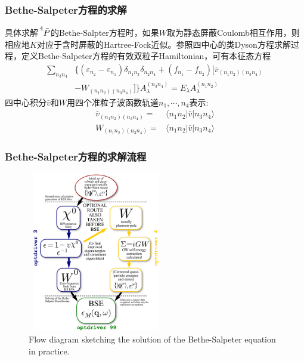 \frame
{
	\frametitle{\textrm{Bethe-Salpeter}方程的求解}
	具体求解$\sideset{^4}{}{\mathop{\bar{P}}}$的\textrm{Bethe-Salpter}方程时，如果$W$取为静态屏蔽\textrm{Coulomb}相互作用，则相应地$K$对应于含时屏蔽的\textrm{Hartree-Fock}近似。参照四中心的类\textrm{Dyson}方程求解过程，定义\textrm{Bethe-Salpeter}方程的有效双粒子\textrm{Hamiltonian}，可有本征态方程
	\begin{displaymath}
		\begin{aligned}
			\sum_{n_3n_4}&\{(\varepsilon_{n_2}-\varepsilon_{n_1})\delta_{n_1n_3}\delta_{n_2n_4}+(f_{n_1}-f_{n_2})[\bar{v}_{(n_1n_2)(n_3n_4)}\\
			&-W_{(n_1n_2)(n_3n_4)}]\}A_{\lambda}^{(n_3n_4)}=E_{\lambda}A_{\lambda}^{(n_1n_2)}
		\end{aligned}
	\end{displaymath}
	四中心积分$\bar{v}$和$W$用四个准粒子波函数轨道$n_1,\cdots,n_4$表示:
	\begin{displaymath}
		\begin{aligned}
			\bar{v}_{(n_1n_2)(n_3n_4)}=&\langle n_1n_2|\bar{v}|n_3n_4\rangle\\	
			W_{(n_1n_2)(n_3n_4)}=&\langle n_1n_2|\bar{v}|n_3n_4\rangle	
		\end{aligned}
	\end{displaymath}
{\fontsize{8.5pt}{6.2pt}}
}

\frame
{
	\frametitle{\textrm{Bethe-Salpeter}方程的求解流程}
\begin{figure}[h!]
\centering
\vspace{-10pt}
\includegraphics[height=2.75in,width=2.35in,viewport=0 0 600 735,clip]{Figures/BSE_solution.png}
\caption{\textrm{\tiny Flow diagram sketching the solution of the Bethe-Salpeter equation in practice.}}%
\label{GW-BSE_solution}
\end{figure}
}

